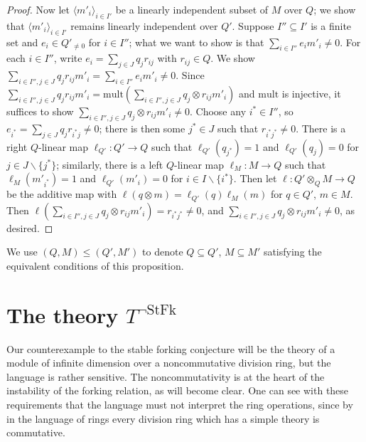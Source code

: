 \documentclass{amsart}
\theoremstyle{definition}
\theoremstyle{remark}
\numberwithin{equation}{section}
\begin{document}
\begin{proof}
Now let $\langle m'_{i}\rangle_{i \in I'}$ be a linearly independent subset of $M$ over $Q$; we show that $\langle m'_{i}\rangle_{i \in I'}$ remains linearly independent over $Q'$. Suppose $ I'' \subseteq I'$ is a finite set and $e_{i} \in Q'_{\neq 0}$ for $i \in I''$; what we want to show is that $\sum_{i \in I''} e_{i}m'_{i} \neq 0$. For each $i \in I''$, write $e_{i} = \sum_{j \in J}q_{j} r_{ij}$ with $r_{ij} \in Q$.  We show $\sum_{i \in I'', j \in J} q_{j}r_{ij}m'_{i} = \sum_{i \in I''} e_{i}m'_{i} \neq 0$. Since $\sum_{i \in I'', j \in J} q_{j}r_{ij}m'_{i} = \mathrm{mult}(\sum_{i \in I'', j \in J} q_{j} \otimes r_{ij} m'_{i})$ and $\mathrm{mult}$ is injective, it suffices to show $\sum_{i \in I'', j \in J} q_{j} \otimes r_{ij} m'_{i} \neq 0$. Choose any $i^{*} \in I''$, so $e_{i^{*}} = \sum_{j \in J} q_{j}r_{i^{*}j} \neq 0$; there is then some $j^{*} \in J$ such that $r_{i^{*}j^{*}} \neq 0$. There is a right $Q$-linear map $\ell_{Q'}: Q' \to Q$ such that $\ell_{Q'}(q_{j^{*}}) = 1$ and $\ell_{Q'}(q_{j}) = 0$ for $j \in J \backslash \{j^{*}\}$; similarly, there is a left $Q$-linear map $\ell_{M}: M \to Q$ such that $\ell_{M}(m'_{i^{*}}) = 1$ and $\ell_{Q'}(m'_{i}) = 0$ for $i \in I \backslash \{i^{*}\}$. Then let $\ell: Q'\otimes_{Q} M \to Q$ be the additive map with $\ell(q \otimes m)=\ell_{Q'}(q)\ell_{M}(m)$ for $q \in Q'$, $m \in M$. Then $\ell(\sum_{i \in I'', j \in J} q_{j} \otimes r_{ij} m'_{i})=r_{i^{*}j^{*}} \neq 0$, and $\sum_{i \in I'', j \in J} q_{j} \otimes r_{ij} m'_{i} \neq 0$, as desired. 


    
\end{proof}


We use $(Q, M) \leq (Q', M')$ to denote $Q \subseteq Q'$, $M \subseteq M'$ satisfying the equivalent conditions of this proposition.

\section{The theory $T^{\neg\mathrm{StFk}}$}\label{Tnegstfk}

Our counterexample to the stable forking conjecture will be the theory of a module of infinite dimension over a noncommutative division ring, but the language is rather sensitive. The noncommutativity is at the heart of the instability of the forking relation, as will become clear. One can see with these requirements that the language must not interpret the ring operations, since by \cite{pillay1998supersimple} in the language of rings every division ring which has a simple theory is commutative. 
\end{document}
